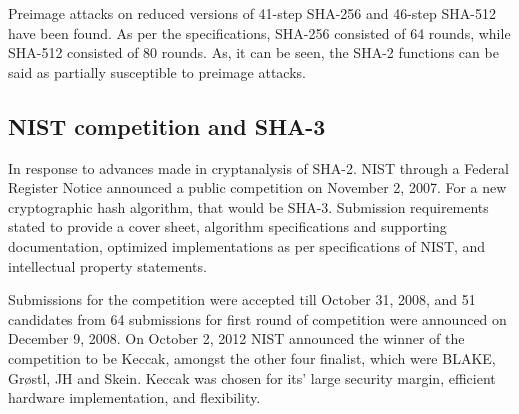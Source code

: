   Preimage attacks on reduced versions of 41-step SHA-256 and 46-step SHA-512 have been found. As per the
  specifications, SHA-256 consisted of 64 rounds, while SHA-512 consisted of 80 rounds.\cite{00011} As, it
  can be seen, the SHA-2 functions can be said as partially susceptible to preimage attacks.

  \subsection{NIST competition and SHA-3}

  In response to advances made in cryptanalysis of SHA-2. NIST through a Federal Register Notice announced 
  a public competition on November 2, 2007. For a new cryptographic hash algorithm, that would be SHA-3.
  Submission requirements stated to provide a cover sheet, algorithm specifications and supporting
  documentation, optimized implementations as per specifications of NIST, and intellectual property statements.

  Submissions for the competition were accepted till October 31, 2008, and 51 candidates from 64 submissions
  for first round of competition were announced on December 9, 2008. On October 2, 2012 NIST announced the 
  winner of the competition to be Keccak, amongst the other four finalist, which were BLAKE, Gr{\o}stl, JH
  and Skein. Keccak was chosen for its' large security margin, efficient hardware implementation, and 
  flexibility.
